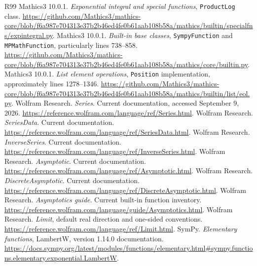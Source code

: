 \documentclass[11pt,letterpaper]{article}
\newcommand{\code}[1]{\texttt{#1}}
\begin{document}
\begin{thebibliography}{R99}
 Mathics3 10.0.1. \emph{Exponential integral and special functions}, \code{ProductLog} class. \url{https://github.com/Mathics3/mathics-core/blob/f6a987e704313e37b2b46ed4fe0b61aab108b58a/mathics/builtin/specialfns/expintegral.py}.
 Mathics3 10.0.1. \emph{Built-in base classes}, \code{SympyFunction} and \code{MPMathFunction}, particularly lines 738--858. \url{https://github.com/Mathics3/mathics-core/blob/f6a987e704313e37b2b46ed4fe0b61aab108b58a/mathics/core/builtin.py}.
 Mathics3 10.0.1. \emph{List element operations}, \code{Position} implementation, approximately lines 1278--1346. \url{https://github.com/Mathics3/mathics-core/blob/f6a987e704313e37b2b46ed4fe0b61aab108b58a/mathics/builtin/list/eol.py}.
 Wolfram Research. \emph{Series}. Current documentation, accessed September 9, 2026. \url{https://reference.wolfram.com/language/ref/Series.html}.
 Wolfram Research. \emph{SeriesData}. Current documentation. \url{https://reference.wolfram.com/language/ref/SeriesData.html}.
 Wolfram Research. \emph{InverseSeries}. Current documentation. \url{https://reference.wolfram.com/language/ref/InverseSeries.html}.
 Wolfram Research. \emph{Asymptotic}. Current documentation. \url{https://reference.wolfram.com/language/ref/Asymptotic.html}.
 Wolfram Research. \emph{DiscreteAsymptotic}. Current documentation. \url{https://reference.wolfram.com/language/ref/DiscreteAsymptotic.html}.
 Wolfram Research. \emph{Asymptotics guide}. Current built-in function inventory. \url{https://reference.wolfram.com/language/guide/Asymptotics.html}.
 Wolfram Research. \emph{Limit}, default real direction and one-sided conventions. \url{https://reference.wolfram.com/language/ref/Limit.html}.
 SymPy. \emph{Elementary functions}, LambertW, version 1.14.0 documentation. \url{https://docs.sympy.org/latest/modules/functions/elementary.html#sympy.functions.elementary.exponential.LambertW}.
\end{thebibliography}
\end{document}
